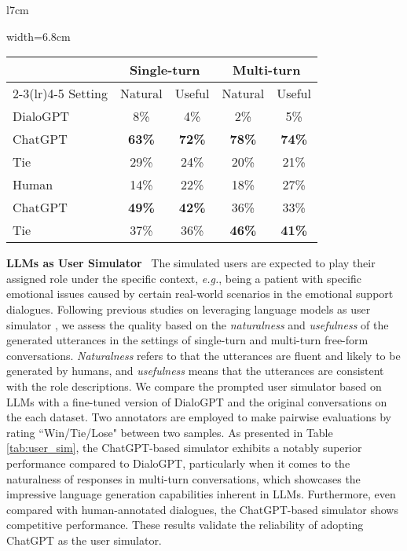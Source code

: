 \documentclass{article} %
\begin{document}
\begin{wraptable}{l}{7cm}
\begin{adjustbox}{width=6.8cm}
\begin{tabular}{lcccc}
\toprule  
&\multicolumn{2}{c}{Single-turn}&\multicolumn{2}{c}{Multi-turn}\\
\cmidrule(lr){2-3}\cmidrule(lr){4-5}
Setting &Natural   & Useful &Natural   & Useful\\
\midrule
DialoGPT & 8\% & 4\% & 2\% & 5\% \\  
ChatGPT & \textbf{63\%} & \textbf{72\%} & \textbf{78\%} & \textbf{74\%}\\  
Tie & 29\% & 24\% & 20\% & 21\%\\  
\midrule
Human & 14\% & 22\% & 18\% & 27\%\\  
ChatGPT & \textbf{49\%} & \textbf{42\%} & 36\% & 33\%\\  
Tie & 37\% & 36\% & \textbf{46\%} &\textbf{41\%}\\  
\bottomrule
\end{tabular}
\end{adjustbox}
\caption{Comparison on user simulators. The Cohen’s Kappa between annotators is 0.72. }\label{tab:user_sim}
\end{wraptable} 

\noindent \textbf{LLMs as User Simulator}~ 
The simulated users are expected to play their assigned role under the specific context, \textit{e.g.}, being a patient with specific emotional issues caused by certain real-world scenarios in the emotional support dialogues. 
Following previous studies on leveraging language models as user simulator \citep{wsdm22-user-sim,llm-crs-eval},  we assess the quality based on the \textit{naturalness} and \textit{usefulness} of the generated utterances in the settings of single-turn and multi-turn free-form conversations. \textit{Naturalness} refers to that the utterances are fluent and likely to be generated by humans, and \textit{usefulness} means that the utterances are consistent with the role descriptions. We compare the prompted user simulator based on LLMs with a fine-tuned version of DialoGPT \citep{dialogpt} and the original conversations on the each dataset. 
Two annotators are employed to make pairwise evaluations by rating ``Win/Tie/Lose" between two samples. 
As presented in Table \ref{tab:user_sim}, the ChatGPT-based simulator exhibits a notably superior performance compared to DialoGPT, particularly when it comes to the naturalness of responses in multi-turn conversations, which showcases the impressive language generation capabilities inherent in LLMs. 
Furthermore, even compared with human-annotated dialogues, the ChatGPT-based simulator shows competitive performance. These results validate the reliability of adopting ChatGPT as the user simulator. 
\end{document}
